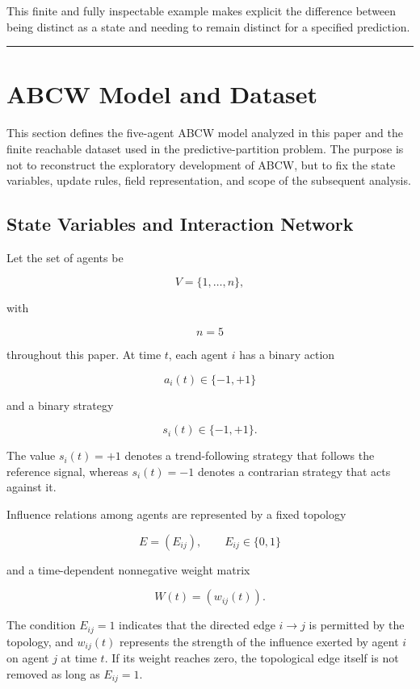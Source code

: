 \documentclass[
  11pt,
]{article}
\begin{document}
This finite and fully inspectable example makes explicit the difference
between being distinct as a state and needing to remain distinct for a
specified prediction.

\begin{center}\rule{0.5\linewidth}{0.5pt}\end{center}

\hypertarget{abcw-model-and-dataset}{%
\section{ABCW Model and Dataset}\label{abcw-model-and-dataset}}

This section defines the five-agent ABCW model analyzed in this paper
and the finite reachable dataset used in the predictive-partition
problem. The purpose is not to reconstruct the exploratory development
of ABCW, but to fix the state variables, update rules, field
representation, and scope of the subsequent analysis.

\hypertarget{state-variables-and-interaction-network}{%
\subsection{State Variables and Interaction
Network}\label{state-variables-and-interaction-network}}

Let the set of agents be

\[{V=\lbrace1,\ldots,n\rbrace,}\]

with

\[{n=5}\]

throughout this paper. At time \({t}\), each agent \({i}\) has a binary
action

\[{a_i(t)\in\lbrace-1,+1\rbrace}\]

and a binary strategy

\[{s_i(t)\in\lbrace-1,+1\rbrace.}\]

The value \({s_i(t)=+1}\) denotes a trend-following strategy that
follows the reference signal, whereas \({s_i(t)=-1}\) denotes a
contrarian strategy that acts against it.

Influence relations among agents are represented by a fixed topology

\[{E=(E_{ij}),\qquad E_{ij}\in\lbrace0,1\rbrace}\]

and a time-dependent nonnegative weight matrix

\[{W(t)=(w_{ij}(t)).}\]

The condition \({E_{ij}=1}\) indicates that the directed edge
\({i\to j}\) is permitted by the topology, and \({w_{ij}(t)}\)
represents the strength of the influence exerted by agent \({i}\) on
agent \({j}\) at time \({t}\). If its weight reaches zero, the
topological edge itself is not removed as long as \({E_{ij}=1}\).
\end{document}
